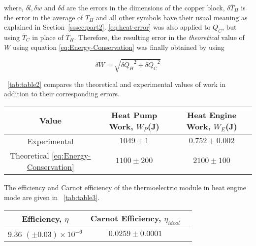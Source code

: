 \documentclass{article}
\newcommand{\tabref}[2][\tablename~]{#1\ref{#2}}
\newcommand{\secref}[2][Section~]{#1\ref{#2}}
\begin{document}
\vspace{2mm}
\noindent
where, $\delta l, \delta w$ and $\delta d$ are the errors in the dimensions of the copper block, $\delta \overline T_H$ is the error in the average of $T_H$ and all other symbols have their usual meaning as explained in \secref{sssec:part2}. \eqref{eq:heat-error} was also applied to $Q_C$, but using $\overline T_C $ in place of $\overline T_H$. Therefore, the resulting error in the \textit{theoretical} value of $W$ using equation \eqref{eq:Energy-Conservation} was finally obtained by using 

\begin{equation}
\label{eq:energy-error}
\delta W = \sqrt{{\delta Q_H}^2 + {\delta Q_C}^2 }
\end{equation}

\vspace{2mm}
\noindent
\tabref{tab:table2} compares the theoretical and experimental values of work in addition to their corresponding errors.

\vspace{5mm}
\begin{table*}[h]
\centering %
\caption{Table of values for the work done in heat pump and heat engine mode for the 5 $\Omega$ resistor; obtained from an experimental graphical approach and using equation \eqref{eq:Energy-Conservation}.}
\label{tab:table2}
\begin{tabular}{|c|c|c|}
\hline
Value & Heat Pump Work, $W_P$(J) & Heat Engine Work, $W_E$(J) \\
\hline
Experimental & $1049 \pm 1$ & $0.752 \pm 0.002$ \\
\hline
Theoretical \eqref{eq:Energy-Conservation} & $1100 \pm 200$ & $2100 \pm 100$ \\
\hline
\end{tabular}
\end{table*}

\vspace{2mm}
\noindent
The efficiency and Carnot efficiency of the thermoelectric module in heat engine mode are given in \tabref{tab:table3}.

\vspace{5mm}
\begin{table*}[h]
\centering %
\caption{A table comparing the efficiency and Carnot efficiency for the thermoelectric module tested in heat engine mode with the 5 $\Omega$ load resistor.}
\label{tab:table3}
\begin{tabular}{|c|c|c|}
\hline
Efficiency, $\eta$ & Carnot Efficiency, $\eta_{ideal}$ \\
\hline
$9.36$ $(\pm 0.03) \times 10^{-6}$ & $0.0259 \pm 0.0001$ \\
\hline
\end{tabular}
\end{table*}
\end{document}
